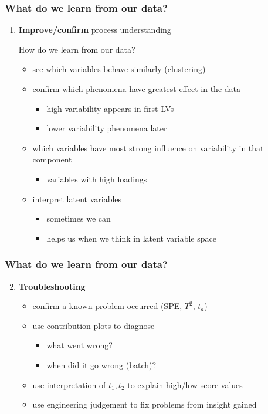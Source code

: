 \documentclass[handout, 12pt]{beamer}
\begin{document}
\begin{frame}\frametitle{What do we learn from our data?}

\begin{enumerate}
	\item {\bf \color{myGreen}Improve/confirm} process understanding
	
		 How do we learn from our data?
\begin{itemize}

	\item	see which variables behave similarly (clustering) \pause
	\item	confirm which phenomena have greatest effect in the data 
	\begin{itemize}
		\item	high variability appears in first LVs
		\item	lower variability phenomena later
	\end{itemize}\pause

	\item	which variables have most strong influence on variability in that component
	\begin{itemize}
		\item variables with high loadings
	\end{itemize}\pause

	\item	interpret latent variables
	\begin{itemize}
		\item	sometimes we can
		\item	helps us when we think in latent variable space
	\end{itemize}
\end{itemize}
\end{enumerate}
\end{frame}

\begin{frame}\frametitle{What do we learn from our data?}

\begin{enumerate}
	\setcounter{enumi}{1}
	\item {\bf \color{myGreen}Troubleshooting}
	\begin{itemize}
		\item 	confirm a known problem occurred (SPE, \( T^2 \), \( t_a \))
		\item 	use contribution plots to diagnose
		\begin{itemize}
			\item 	what went wrong?
			\item 	when did it go wrong (batch)? 
		\end{itemize}\pause
		
		\item 	use interpretation of \( t_1, t_2 \) to explain high/low score values\pause
		\item 	use engineering judgement to fix problems from insight gained
	\end{itemize}
\end{enumerate}
\end{frame}
	
\end{document}
